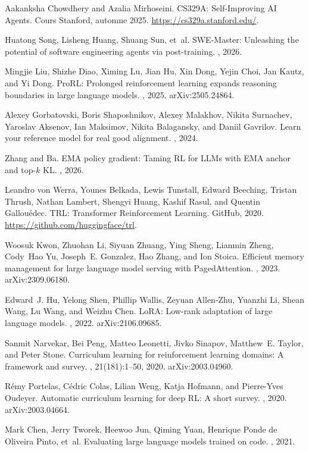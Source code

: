 Aakanksha Chowdhery and Azalia Mirhoseini.
\newblock CS329A: Self-Improving AI Agents. Cours Stanford, automne 2025.
\newblock \url{https://cs329a.stanford.edu/}.

Huatong Song, Lisheng Huang, Shuang Sun, et~al.
\newblock SWE-Master: Unleashing the potential of software engineering agents via post-training.
, 2026.

Mingjie Liu, Shizhe Diao, Ximing Lu, Jian Hu, Xin Dong, Yejin Choi, Jan Kautz, and Yi Dong.
\newblock ProRL: Prolonged reinforcement learning expands reasoning boundaries in large language models.
, 2025. arXiv:2505.24864.

Alexey Gorbatovski, Boris Shaposhnikov, Alexey Malakhov, Nikita Surnachev, Yaroslav Aksenov, Ian Maksimov, Nikita Balagansky, and Daniil Gavrilov.
\newblock Learn your reference model for real good alignment.
, 2024.

Zhang and Ba.
\newblock EMA policy gradient: Taming RL for LLMs with EMA anchor and top-$k$ KL.
, 2026. %

Leandro von Werra, Younes Belkada, Lewis Tunstall, Edward Beeching, Tristan Thrush, Nathan Lambert, Shengyi Huang, Kashif Rasul, and Quentin Gallou\'edec.
\newblock TRL: Transformer Reinforcement Learning.
\newblock GitHub, 2020. \url{https://github.com/huggingface/trl}.

Woosuk Kwon, Zhuohan Li, Siyuan Zhuang, Ying Sheng, Lianmin Zheng, Cody~Hao Yu, Joseph~E. Gonzalez, Hao Zhang, and Ion Stoica.
\newblock Efficient memory management for large language model serving with PagedAttention.
, 2023. arXiv:2309.06180.

Edward~J. Hu, Yelong Shen, Phillip Wallis, Zeyuan Allen-Zhu, Yuanzhi Li, Shean Wang, Lu Wang, and Weizhu Chen.
\newblock LoRA: Low-rank adaptation of large language models.
, 2022. arXiv:2106.09685.

Sanmit Narvekar, Bei Peng, Matteo Leonetti, Jivko Sinapov, Matthew~E. Taylor, and Peter Stone.
\newblock Curriculum learning for reinforcement learning domains: A framework and survey.
, 21(181):1--50, 2020. arXiv:2003.04960.

R\'emy Portelas, C\'edric Colas, Lilian Weng, Katja Hofmann, and Pierre-Yves Oudeyer.
\newblock Automatic curriculum learning for deep RL: A short survey.
, 2020. arXiv:2003.04664.

Mark Chen, Jerry Tworek, Heewoo Jun, Qiming Yuan, Henrique Ponde de Oliveira Pinto, et~al.
\newblock Evaluating large language models trained on code.
, 2021.
